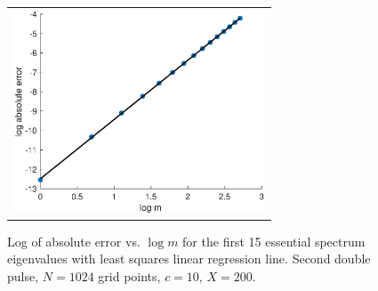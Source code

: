 \documentclass[10pt,reqno]{amsart}
\theoremstyle{plain}
\theoremstyle{definition}
\theoremstyle{remark}
\numberwithin{theorem}{section}
\numberwithin{equation}{section}
\begin{document}
\begin{figure}
\begin{center}
\begin{tabular}{c}
\includegraphics[width=7.5cm]{images/DP2esslogerror.eps}
\end{tabular}
\end{center}
\caption{Log of absolute error vs. $\log m$ for the first 15 essential spectrum eigenvalues with least squares linear regression line. Second double pulse, $N = 1024$ grid points, $c = 10$, $X = 200$.}
\label{fig:DP2esslogerror}
\end{figure}
\end{document}
